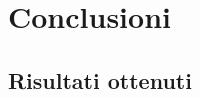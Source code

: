\chapter{Conclusioni\label{sec:conclusioni}}

\section{Risultati ottenuti\label{sec:risultati-ottenuti}}
